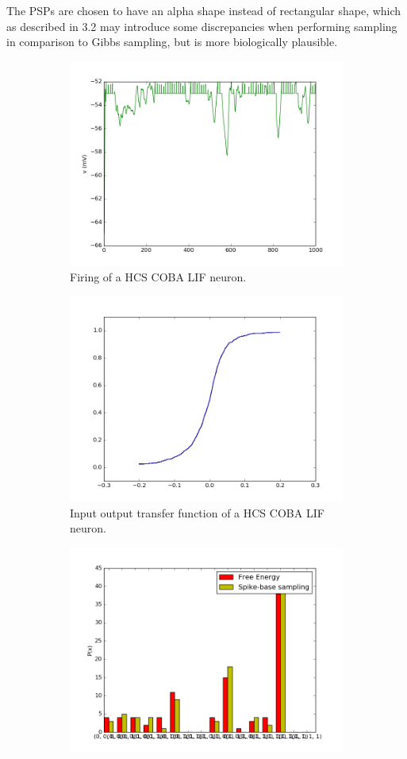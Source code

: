The PSPs are chosen to have an alpha shape instead of rectangular shape, which as described in 3.2 may introduce some discrepancies when performing sampling in comparison to Gibbs sampling, but is more biologically plausible.

\begin{figure}
	\centering
	\begin{subfigure}[t]{.5\textwidth}
  		\centering
  		\includegraphics[width=.8\linewidth]{imgs/coba_lif_act.png}
  		\caption{Firing of a HCS COBA LIF neuron.}
  		\label{fig:sub1}
	\end{subfigure}%
	\begin{subfigure}[t]{.5\textwidth}
  		\centering
  		\includegraphics[width=.8\linewidth]{imgs/coba_lif_sigmoid.png}
  		\caption{Input output transfer function of a HCS COBA LIF neuron.}
  		\label{fig:sub2}
	\end{subfigure}
	\begin{subfigure}[t]{.5\textwidth}
  		\centering
  		\includegraphics[width=.8\linewidth]{imgs/coba_lif_bm2.png}

\end{subfigure}
\end{figure}
